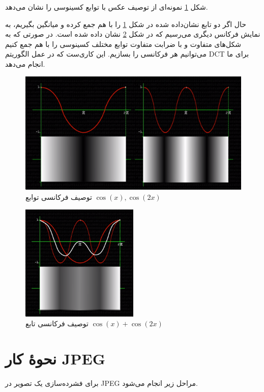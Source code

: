 شکل
\ref{freq_1}
نمونه‌ای از توصیف عکس با توابع کسینوسی را نشان می‌دهد.

حال اگر دو تابع نشان‌داده شده در 
شکل 
\ref{freq_1}
را با هم جمع کرده و میانگین بگیریم، به نمایش فرکانس دیگری می‌رسیم که در شکل 
\ref{freq_2}
نشان داده شده است.
در صورتی که به شکل‌های متفاوت و با ضرابت متفاوت توابع مختلف کسینوسی را با هم جمع کنیم می‌توانیم هر فرکانسی را بسازیم. این کاری‌ست که در 
عمل الگوریتم 
DCT برای ما انجام می‌دهد.
\begin{figure}[]
        \centering
        \includegraphics[width=\textwidth]{figs/freq_1.png}
        \caption{توصیف فرکانسی توابع 
        $\cos (x) , \cos (2x)$ }
        \label{freq_1}
\end{figure}

\begin{figure}[]
        \centering
        \includegraphics[width=0.5\textwidth]{figs/freq_2.png}
        \caption{توصیف فرکانسی تابع 
        $\cos (x) + \cos (2x)$}
        \label{freq_2}
\end{figure}

\section{نحوهٔ کار JPEG}
برای فشرده‌سازی یک تصویر در JPEG 
مراحل زیر انجام می‌شود. 

